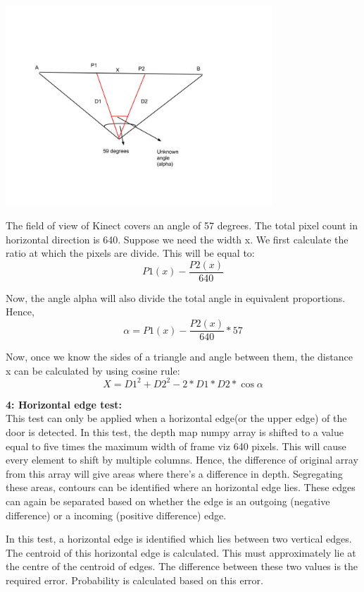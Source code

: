 \documentclass{report}
\begin{document}
\includegraphics[width = 10cm]{Cosine.jpg}

The field of view of Kinect covers an angle of 57 degrees. The total pixel count in horizontal direction is 640. Suppose we need the width x. We first calculate the ratio at which the pixels are divide. This will be equal to:
\begin{equation}
P1(x) - \frac{P2(x)}{640}
\end{equation}

Now, the angle alpha will also divide the total angle in equivalent proportions. Hence, 
\begin{equation}
\alpha = P1(x) - \frac{P2(x)} {640} * 57
\end{equation}

Now, once we know the sides of a triangle and angle between them, the distance x can be calculated by using cosine rule:
\begin{equation}
X = D1^2 + D2^2 - 2*D1*D2*\cos{\alpha}
\end{equation}
\pagebreak

\textbf{4: Horizontal edge test:} \\

This test can only be applied when a horizontal edge(or the upper edge) of the door is detected. In this test, the depth map numpy array is shifted to a value equal to five times the maximum width of frame viz 640 pixels. This will cause every element to shift by multiple columns. Hence, the difference of original array from this array will give areas where there's a difference in depth. Segregating these areas, contours can be identified where an horizontal edge lies. These edges can again be separated based on whether the edge is an outgoing (negative difference) or a incoming (positive difference) edge.

In this test, a horizontal edge is identified which lies between two vertical edges. The centroid of this horizontal edge is calculated. This must approximately lie at the centre of the centroid of edges. The difference between these two values is the required error. Probability is calculated based on this error.
\end{document}
